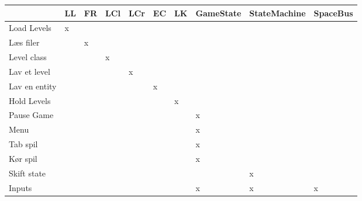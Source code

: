 \begin{table}[h!]
\hspace{-35pt}
\label{my-label}
\begin{tabular}{|l|l|l|l|l|l|l|l|l|l|}
\hline
               & LL & FR & LCl & LCr & EC & LK & GameState & StateMachine & SpaceBus \\\hline

Load Levels   &          x           &            &       &      &              &       &       &       &      \\\hline
Læs filer    &         &              x          &       &      &              &       &       &       &       \\\hline
Level class        &         &             &             x    &      &              &      &       &          &     \\\hline
Lav et level  &         &             &            &       x&                   &       &       &       &       \\\hline
Lav en entity &         &             &            &       &     x &                      &       &       &     \\\hline
Hold Levels   &         &             &            &       &      &x            &            &       & \\\hline
Pause Game &         &             &            &       &      &                      &x       &       &     \\\hline
Menu &         &             &            &       &      &                      &x       &       &     \\\hline
Tab spil &         &             &            &       &      &                      &x       &       &     \\\hline
Kør spil &         &             &            &       &      &                      &x       &       &     \\\hline
Skift state &         &             &            &       &      &                      &       &x       &     \\\hline
Inputs &         &             &            &       &      &                      & x           & x   & x  \\\hline
\end{tabular}
\end{table}

